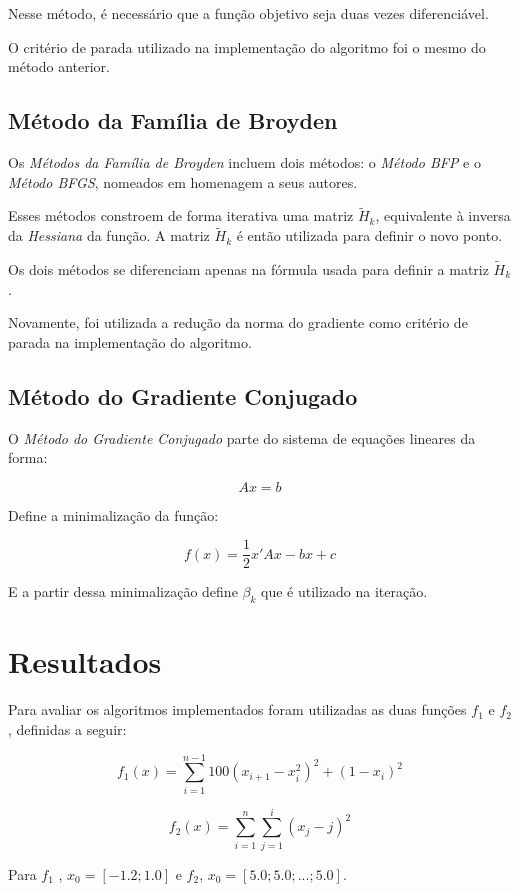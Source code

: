 \documentclass[10pt,a4paper]{article}
\begin{document}
	Nesse método, é necessário que a função objetivo seja duas vezes diferenciável.

	O critério de parada utilizado na implementação do algoritmo foi o mesmo do método anterior.

	\subsection{Método da Família de Broyden}

	Os \emph{Métodos da Família de Broyden} incluem dois métodos: o \emph{Método BFP} e o \emph{Método BFGS}, nomeados em homenagem a seus autores. 

	Esses métodos constroem de forma iterativa uma matriz $\widetilde{H}_k$, equivalente à inversa da \emph{Hessiana} da função. A matriz $\widetilde{H}_k$ é então utilizada para definir o novo ponto.

	Os dois métodos se diferenciam apenas na fórmula usada para definir a matriz $\widetilde{H}_k$.

	Novamente, foi utilizada a redução da norma do gradiente como critério de parada na implementação do algoritmo.

	\subsection{Método do Gradiente Conjugado}

	O \emph{Método do Gradiente Conjugado} parte do sistema de equações lineares da forma:

	$$ Ax = b $$

	Define a minimalização da função:

	$$ f(x) = \frac{1}{2}x'Ax-bx+c $$

	E a partir dessa minimalização define $\beta_k$ que é utilizado na iteração.

	\section{Resultados}

	Para avaliar os algoritmos implementados foram utilizadas as duas funções $f_1$ e $f_2$, definidas a seguir:

	$$ f_1(x) = \sum_{i=1}^{n-1}100(x_{i+1}-x_i^2)^2+(1-x_i)^2 $$

	$$ f_2(x) = \sum_{i=1}^n \sum_{j=1}^{i} (x_j-j)^2 $$

	Para $f_1$ , $x_0 = [-1.2;1.0]$ e $f_2$, $x_0 = [5.0;5.0;...;5.0]$.
\end{document}
